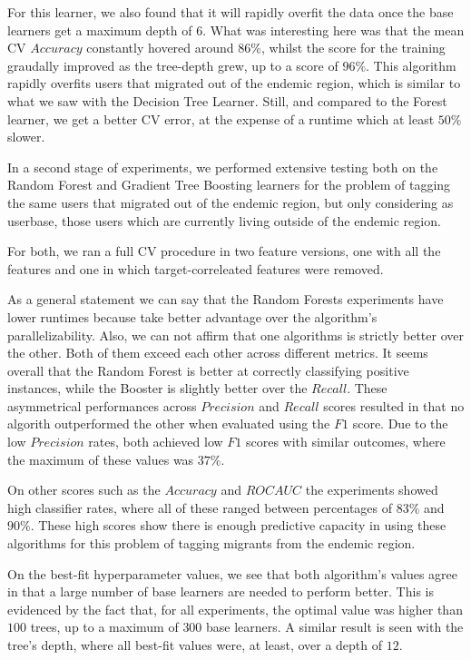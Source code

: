 For this learner, we also found that it will rapidly overfit the data once the base learners get a maximum depth of $6$.
What was interesting here was that the mean CV $Accuracy$ constantly hovered around $86\%$, whilst the score for the training graudally improved as the tree-depth grew, up to a score of $96\%$.
This algorithm rapidly overfits users that migrated out of the endemic region, which is similar to what we saw with the Decision Tree Learner.
Still, and compared to the Forest learner, we get a better CV error, at the expense of a runtime which at least $50\%$ slower.


In a second stage of experiments, we performed extensive testing both on the Random Forest and Gradient Tree Boosting learners for the problem of tagging the same users that migrated out of the endemic region, but only considering as userbase, those users which are currently living outside of the endemic region.

For both, we ran a full CV procedure in two feature versions, one with all the features and one in which target-correleated features were removed.

As a general statement we can say that the Random Forests experiments have lower runtimes because take better advantage over the algorithm's parallelizability.
Also, we can not affirm that one algorithms is strictly better over the other.
Both of them exceed each other across different metrics.
It seems overall that the Random Forest is better at correctly classifying positive instances, while the Booster is slightly better over the $Recall$.
These asymmetrical performances across $Precision$ and $Recall$ scores resulted in that no algorith outperformed the other when evaluated using the $F1$ score.
Due to the low $Precision$ rates, both achieved low $F1$ scores with similar outcomes, where the maximum of these values was $37\%$.

On other scores such as the $Accuracy$ and $ROC AUC$ the experiments showed high classifier rates, where all of these ranged between percentages of $83\%$ and $90\%$.
These high scores show there is enough predictive capacity in using these algorithms for this problem of tagging migrants from the endemic region.

On the best-fit hyperparameter values, we see that both algorithm's values agree in that a large number of base learners are needed to perform better.
This is evidenced by the fact that, for all experiments, the optimal value was higher than $100$ trees, up to a maximum of $300$ base learners.
A similar result is seen with the tree's depth, where all best-fit values were, at least, over a depth of $12$.


